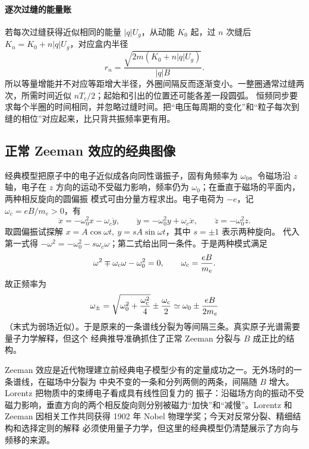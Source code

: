 \paragraph{逐次过缝的能量账}
若每次过缝获得近似相同的能量 $|q|U_g$，从动能 $K_0$ 起，过 $n$ 次缝后
$K_n=K_0+n|q|U_g$，对应盒内半径
\[
 r_n=\frac{\sqrt{2m(K_0+n|q|U_g)}}{|q|B}.
\]
所以等量增能并不对应等距增大半径，外圈间隔反而逐渐变小。一整圈通常过缝两次，所需时间近似 $nT_c/2$；起始和引出的位置还可能各差一段圆弧。
恒频同步要求每个半圈的时间相同，并忽略过缝时间。把“电压每周期的变化”和“粒子每次到缝的相位”对应起来，比只背共振频率更有用。

\subsection*{正常 Zeeman 效应的经典图像}

经典模型把原子中的电子近似成各向同性谐振子，固有角频率为 $\omega_0$。令磁场沿 $z$ 轴，电子在
$z$ 方向的运动不受磁力影响，频率仍为 $\omega_0$；在垂直于磁场的平面内，两种相反旋向的圆偏振
模式可由分量方程求出。电子电荷为 $-e$，记 $\omega_c=eB/m_e>0$，有
\[
 \ddot x=-\omega_0^2x-\omega_c\dot y,\qquad
 \ddot y=-\omega_0^2y+\omega_c\dot x,\qquad
 \ddot z=-\omega_0^2z.
\]
取圆偏振试探解 $x=A\cos\omega t,\ y=sA\sin\omega t$，其中 $s=\pm1$ 表示两种旋向。
代入第一式得 $-\omega^2=-\omega_0^2-s\omega_c\omega$；第二式给出同一条件。于是两种模式满足
\begin{equation}
  \omega^2\mp\omega_{\rm c}\omega-\omega_0^2=0,
  \qquad \omega_{\rm c}=\frac{eB}{m_e}.
\end{equation}
故正频率为
\begin{equation}
  \omega_\pm=\sqrt{\omega_0^2+\frac{\omega_{\rm c}^2}{4}}
  \pm\frac{\omega_{\rm c}}2
  \simeq \omega_0\pm\frac{eB}{2m_e}
\end{equation}
（末式为弱场近似）。于是原来的一条谱线分裂为等间隔三条。真实原子光谱需要量子力学解释，但这个
经典推导准确抓住了正常 Zeeman 分裂与 $B$ 成正比的结构。

Zeeman 效应是近代物理建立前经典电子模型少有的定量成功之一。无外场时的一条谱线，在磁场中分裂为
中央不变的一条和分列两侧的两条，间隔随 $B$ 增大。Lorentz 把物质中的束缚电子看成具有线性回复力的
振子：沿磁场方向的振动不受磁力影响，垂直方向的两个相反旋向则分别被磁力“加快”和“减慢”。Lorentz
和 Zeeman 因相关工作共同获得 1902 年 Nobel 物理学奖；今天对反常分裂、精细结构和选择定则的解释
必须使用量子力学，但这里的经典模型仍清楚展示了方向与频移的来源。

\zeemanSpectrumDiagram

